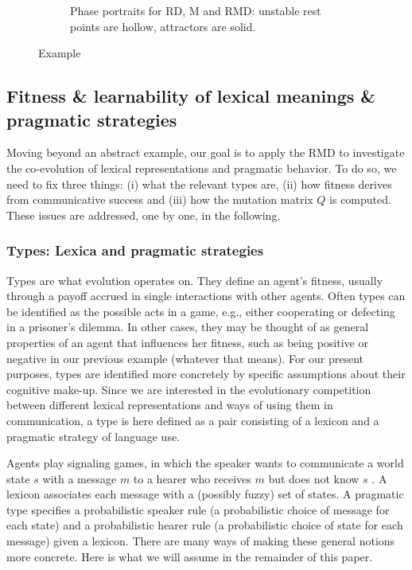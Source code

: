 \documentclass[a4paper, 11pt]{article}
\theoremstyle{Satz}
\begin{document}
\begin{figure}[t]
\begin{subfigure}[b]{0.5\textwidth}
        


    \caption{Phase portraits for RD, M and RMD: unstable rest points are hollow, attractors are
      solid.}
        \label{fig:Phase_RD}
    \end{subfigure}

  \caption{Example}
  \label{fig:Example_RMD}
\end{figure}


\subsection{Fitness \& learnability of lexical meanings \& pragmatic strategies}
\label{sec:fitn--learn}

Moving beyond an abstract example, our goal is to apply the RMD to investigate the co-evolution
of lexical representations and pragmatic behavior. To do so, we need to fix three things: (i) what the
relevant types are, (ii) how fitness derives from communicative success and (iii) how the
mutation matrix $Q$ is computed. These issues are addressed, one by one, in the following.

\subsubsection{Types: Lexica and pragmatic strategies}
\label{sec:languages+use}

Types are what evolution operates on. They define an agent's fitness, usually through a payoff
accrued in single interactions with other agents. Often types can be identified as the possible
acts in a game, e.g., either cooperating or defecting in a prisoner's dilemma. In other cases,
they may be thought of as general properties of an agent that influences her fitness, such as
being positive or negative in our previous example (whatever that means). For our present
purposes, types are identified more concretely by specific assumptions about their cognitive
make-up. Since we are interested in the evolutionary competition between different lexical
representations and ways of using them in communication, a type is here defined as a pair consisting
of a lexicon and a pragmatic strategy of language use.

Agents play signaling games, in which the speaker wants to communicate a world state $s$ with a
message $m$ to a hearer who receives $m$ but does not know $s$
\citep[e.g.][]{lewis:1969,Skyrms2010:Signals}. A lexicon associates each message with a
(possibly fuzzy) set of states. A pragmatic type specifies a probabilistic speaker
rule (a probabilistic choice of message for each state) and a probabilistic hearer rule (a
probabilistic choice of state for each message) given a lexicon. There are many ways of making these general
notions more concrete. Here is what we will assume in the remainder of this paper.
\end{document}
